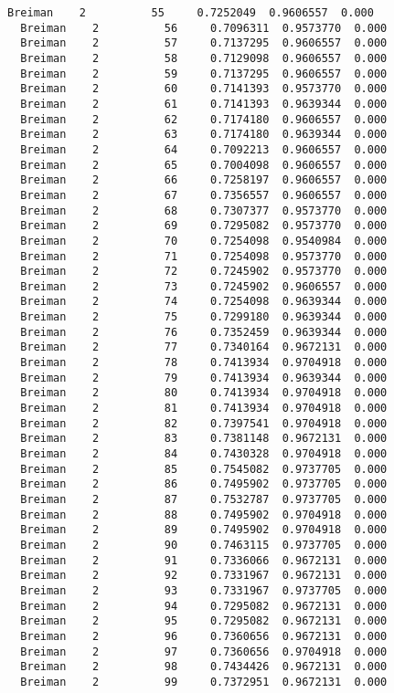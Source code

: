 \documentclass[11pt]{article}
\begin{document}
\begin{Verbatim}[commandchars=\\\{\}]
  Breiman    2          55     0.7252049  0.9606557  0.000
  Breiman    2          56     0.7096311  0.9573770  0.000
  Breiman    2          57     0.7137295  0.9606557  0.000
  Breiman    2          58     0.7129098  0.9606557  0.000
  Breiman    2          59     0.7137295  0.9606557  0.000
  Breiman    2          60     0.7141393  0.9573770  0.000
  Breiman    2          61     0.7141393  0.9639344  0.000
  Breiman    2          62     0.7174180  0.9606557  0.000
  Breiman    2          63     0.7174180  0.9639344  0.000
  Breiman    2          64     0.7092213  0.9606557  0.000
  Breiman    2          65     0.7004098  0.9606557  0.000
  Breiman    2          66     0.7258197  0.9606557  0.000
  Breiman    2          67     0.7356557  0.9606557  0.000
  Breiman    2          68     0.7307377  0.9573770  0.000
  Breiman    2          69     0.7295082  0.9573770  0.000
  Breiman    2          70     0.7254098  0.9540984  0.000
  Breiman    2          71     0.7254098  0.9573770  0.000
  Breiman    2          72     0.7245902  0.9573770  0.000
  Breiman    2          73     0.7245902  0.9606557  0.000
  Breiman    2          74     0.7254098  0.9639344  0.000
  Breiman    2          75     0.7299180  0.9639344  0.000
  Breiman    2          76     0.7352459  0.9639344  0.000
  Breiman    2          77     0.7340164  0.9672131  0.000
  Breiman    2          78     0.7413934  0.9704918  0.000
  Breiman    2          79     0.7413934  0.9639344  0.000
  Breiman    2          80     0.7413934  0.9704918  0.000
  Breiman    2          81     0.7413934  0.9704918  0.000
  Breiman    2          82     0.7397541  0.9704918  0.000
  Breiman    2          83     0.7381148  0.9672131  0.000
  Breiman    2          84     0.7430328  0.9704918  0.000
  Breiman    2          85     0.7545082  0.9737705  0.000
  Breiman    2          86     0.7495902  0.9737705  0.000
  Breiman    2          87     0.7532787  0.9737705  0.000
  Breiman    2          88     0.7495902  0.9704918  0.000
  Breiman    2          89     0.7495902  0.9704918  0.000
  Breiman    2          90     0.7463115  0.9737705  0.000
  Breiman    2          91     0.7336066  0.9672131  0.000
  Breiman    2          92     0.7331967  0.9672131  0.000
  Breiman    2          93     0.7331967  0.9737705  0.000
  Breiman    2          94     0.7295082  0.9672131  0.000
  Breiman    2          95     0.7295082  0.9672131  0.000
  Breiman    2          96     0.7360656  0.9672131  0.000
  Breiman    2          97     0.7360656  0.9704918  0.000
  Breiman    2          98     0.7434426  0.9672131  0.000
  Breiman    2          99     0.7372951  0.9672131  0.000

\end{Verbatim}
\end{document}
